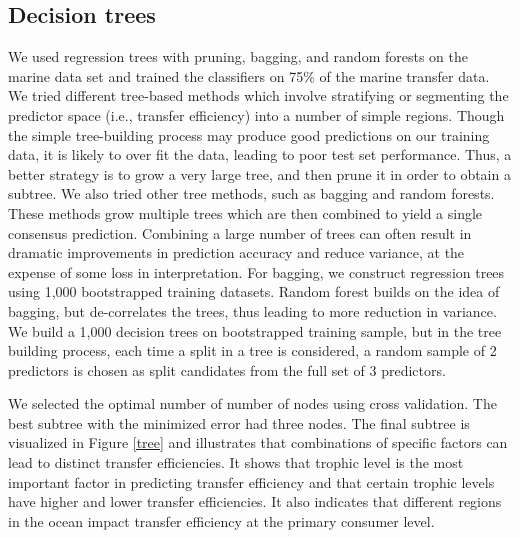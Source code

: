 \documentclass[oneside,12pt,final]{sty/ucthesis-CA2012}
\begin{document}
\begin{mainmatter}
\section{Decision trees}
We used regression trees with pruning, bagging, and random forests on the marine data set and trained the classifiers on 75\% of the marine transfer data. We tried different tree-based methods which involve stratifying or segmenting the predictor space (i.e., transfer efficiency) into a number of simple regions. Though the simple tree-building process may produce good predictions on our training data, it is likely to over fit the data, leading to poor test set performance. Thus, a better strategy is to grow a very large tree, and then prune it in order to obtain a subtree. We also tried other tree methods, such as bagging and random forests. These methods grow multiple trees which are then combined to yield a single consensus prediction. Combining a large number of trees can often result in dramatic improvements in prediction accuracy and reduce variance, at the expense of some loss in interpretation. For bagging, we construct regression trees using 1,000 bootstrapped training datasets. Random forest builds on the idea of bagging, but de-correlates the trees, thus leading to more reduction in variance. We build a 1,000 decision trees on bootstrapped training sample, but in the tree building process, each time a split in a tree is considered, a random sample of 2 predictors is chosen as split candidates from the full set of 3 predictors.

\vspace{5mm}

We selected the optimal number of number of nodes using cross validation. The best subtree with the minimized error had three nodes. The final subtree is visualized in Figure \ref{tree} and illustrates that combinations of specific factors can lead to distinct transfer efficiencies. It shows that trophic level is the most important factor in predicting transfer efficiency and that certain trophic levels have higher and lower transfer efficiencies. It also indicates that different regions in the ocean impact transfer efficiency at the primary consumer level. 


\end{mainmatter}
\end{document}

